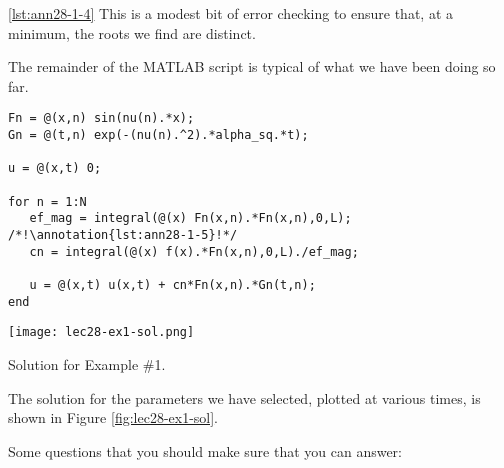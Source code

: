 \vspace{0.25cm}

\noindent \ref{lst:ann28-1-4} This is a modest bit of error checking to ensure that, at a minimum, the roots we find are distinct.

\vspace{0.25cm}

\noindent The remainder of the MATLAB script is typical of what we have been doing so far.

\begin{lstlisting}[name=lec28-ex1, style=myMatlab]
%% Construct solution
Fn = @(x,n) sin(nu(n).*x);
Gn = @(t,n) exp(-(nu(n).^2).*alpha_sq.*t); 

u = @(x,t) 0;

for n = 1:N
   ef_mag = integral(@(x) Fn(x,n).*Fn(x,n),0,L); /*!\annotation{lst:ann28-1-5}!*/
   cn = integral(@(x) f(x).*Fn(x,n),0,L)./ef_mag;
   
   u = @(x,t) u(x,t) + cn*Fn(x,n).*Gn(t,n);
end

\end{lstlisting}
\begin{marginfigure}
\texttt{[image: lec28-ex1-sol.png]}
\caption{Solution for Example \#1.}
\label{fig:lec28-ex1-sol}
\end{marginfigure}
The solution for the parameters we have selected, plotted at various times, is shown in Figure \ref{fig:lec28-ex1-sol}.

Some questions that you should make sure that you can answer:%





